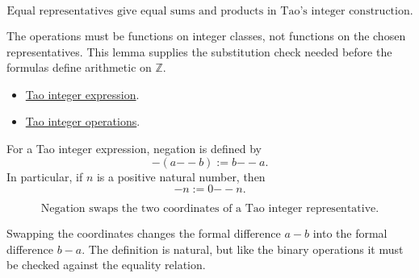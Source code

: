 

\begin{remark*}
\[
  \text{Equal representatives give equal sums and products in Tao's
  integer construction.}
\]
\end{remark*}

\begin{remark*}[Interpretation]
The operations must be functions on integer classes, not functions on the
chosen representatives. This lemma supplies the substitution check needed
before the formulas define arithmetic on \(\mathbb{Z}\).
\end{remark*}

\begin{dependencies}
\begin{itemize}
  \item \hyperref[def:tao-integer-expression]{Tao integer expression}.
  \item \hyperref[def:tao-integer-operations]{Tao integer operations}.
\end{itemize}
\end{dependencies}

\begin{definition}
\label{def:tao-negation}
For a Tao integer expression, negation is defined by
\[
  -(a {-\!\!-} b) := b {-\!\!-} a.
\]
In particular, if \(n\) is a positive natural number, then
\[
  -n := 0 {-\!\!-} n.
\]
\end{definition}


\begin{remark*}
\[
  \text{Negation swaps the two coordinates of a Tao integer representative.}
\]
\end{remark*}

\begin{remark*}[Interpretation]
Swapping the coordinates changes the formal difference \(a-b\) into the
formal difference \(b-a\). The definition is natural, but like the binary
operations it must be checked against the equality relation.
\end{remark*}

